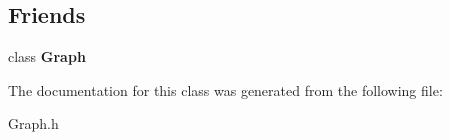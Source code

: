\subsection*{Friends}
\begin{DoxyCompactItemize}
\item 
\hypertarget{class_vertex_afab89afd724f1b07b1aaad6bdc61c47a}{class {\bfseries Graph}}\label{class_vertex_afab89afd724f1b07b1aaad6bdc61c47a}

\end{DoxyCompactItemize}


The documentation for this class was generated from the following file\-:\begin{DoxyCompactItemize}
\item 
Graph.\-h\end{DoxyCompactItemize}
